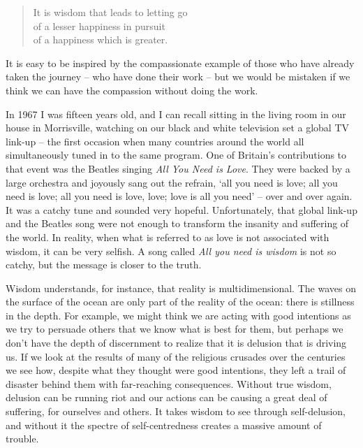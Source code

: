 \begin{quote}
  It is wisdom that leads to letting go\\
  of a lesser happiness in pursuit\\
  of a happiness which is greater.
\end{quote}

It is easy to be inspired by the compassionate example of those who have
already taken the journey -- who have done their work -- but we would be
mistaken if we think we can have the compassion without doing the work.

In 1967 I was fifteen years old, and I can recall sitting in the living
room in our house in Morrisville, watching on our black and white
television set a global TV link-up\cite{satellite}
 -- the first occasion when many countries around
the world all simultaneously tuned in to the same program. One of
Britain's contributions to that event was the Beatles singing \emph{All
You Need is Love}. They were backed by a large orchestra and joyously
sang out the refrain, `all you need is love; all you need is love; all
you need is love, love; love is all you need' -- over and over again. It
was a catchy tune and sounded very hopeful. Unfortunately, that global
link-up and the Beatles song were not enough to transform the insanity
and suffering of the world. In reality, when what is referred to as love
is not associated with wisdom, it can be very selfish. A song called
\emph{All you need is wisdom} is not so catchy, but the message is
closer to the truth.

Wisdom understands, for instance, that reality is multidimensional. The
waves on the surface of the ocean are only part of the reality of the
ocean: there is stillness in the depth. For example, we might think we
are acting with good intentions as we try to persuade others that we
know what is best for them, but perhaps we don't have the depth of
discernment to realize that it is delusion that is driving us. If we
look at the results of many of the religious crusades over the centuries
we see how, despite what they thought were good intentions, they left a
trail of disaster behind them with far-reaching consequences. Without
true wisdom, delusion can be running riot and our actions can be causing
a great deal of suffering, for ourselves and others. It takes wisdom to
see through self-delusion, and without it the spectre of
self-centredness creates a massive amount of trouble.

